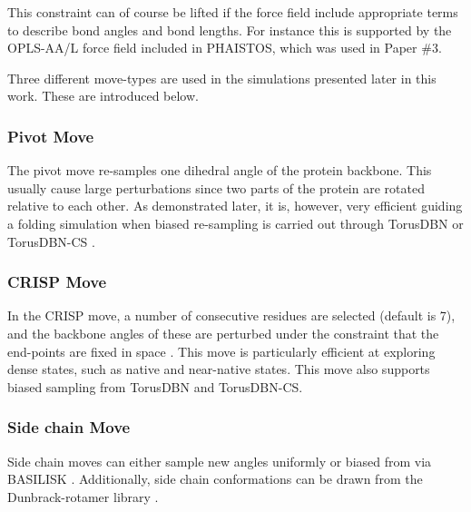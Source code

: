 This constraint can of course be lifted if the force field include appropriate terms to describe bond angles and bond lengths.
For instance this is supported by the OPLS-AA/L force field included in PHAISTOS, which was used in Paper \#3.


Three different move-types are used in the simulations presented later in this work.
These are introduced below.
\subsubsection{Pivot Move}
The pivot move re-samples one dihedral angle of the protein backbone. This usually cause large perturbations since two parts of the protein are rotated relative to each other.
As demonstrated later, it is, however, very efficient guiding a folding simulation when biased re-sampling is carried out through TorusDBN or TorusDBN-CS \cite{Torus08}.

\subsubsection{CRISP Move}
In the CRISP move, a number of consecutive residues are selected (default is 7), and the backbone angles of these are perturbed under the constraint that the end-points are fixed in space \cite{crisp}.
This move is particularly efficient at exploring dense states, such as native and near-native states.
This move also supports biased sampling from TorusDBN and TorusDBN-CS.

\subsubsection{Side chain Move}
Side chain moves can either sample new angles uniformly or biased from via BASILISK \cite{BASILISK}.
Additionally, side chain conformations can be drawn from the Dunbrack-rotamer library \cite{dunbrack}.


% 
% 
% 

